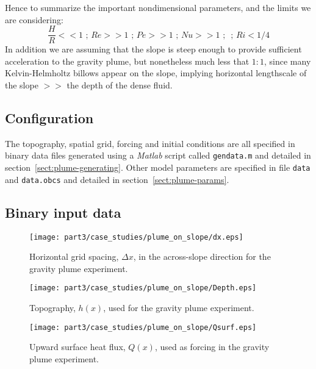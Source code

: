 Hence to summarize the important nondimensional parameters, and 
the limits we are considering:
\begin{equation}
\frac{H}{R} << 1 \mbox{ ; } Re >> 1 \mbox{  ; } Pe >> 1 \mbox{  ; } Nu >> 1
\mbox{  ;  } \mbox{  ; } Ri < 1/4 
\end{equation}
In addition we are assuming that the slope is steep enough to provide 
sufficient acceleration  to the gravity plume, but nonetheless much less 
that $1:1$, since many Kelvin-Helmholtz billows appear on the slope, 
implying horizontal lengthscale of the slope $>>$ the depth of the 
dense fluid. 

\subsection{Configuration}
\label{www:tutorials}

The topography, spatial grid, forcing and initial conditions are all
specified in binary data files generated using a {\em Matlab} script
called {\tt gendata.m} and detailed in
section~\ref{sect:plume-generating}. Other model parameters are
specified in file {\tt data} and {\tt data.obcs} and detailed in
section~\ref{sect:plume-params}.

\subsection{Binary input data}
\label{www:tutorials}
\label{sect:plume-generating}

\begin{figure}
\begin{center}
\texttt{[image: part3/case\_studies/plume\_on\_slope/dx.eps]}
\end{center}
\caption{Horizontal grid spacing, $\Delta x$, in the across-slope
direction for the gravity plume experiment.}
\label{fig:dx-plume-on-slope}
\end{figure}

\begin{figure}
\begin{center}
\texttt{[image: part3/case\_studies/plume\_on\_slope/Depth.eps]}
\end{center}
\caption{Topography, $h(x)$, used for the gravity plume experiment.}
\label{fig:depth-plume-on-slope}
\end{figure}

\begin{figure}
\begin{center}
\texttt{[image: part3/case\_studies/plume\_on\_slope/Qsurf.eps]}
\end{center}
\caption{Upward surface heat flux, $Q(x)$, used as forcing in the
gravity plume experiment.}
\label{fig:Q-plume-on-slope}
\end{figure}

